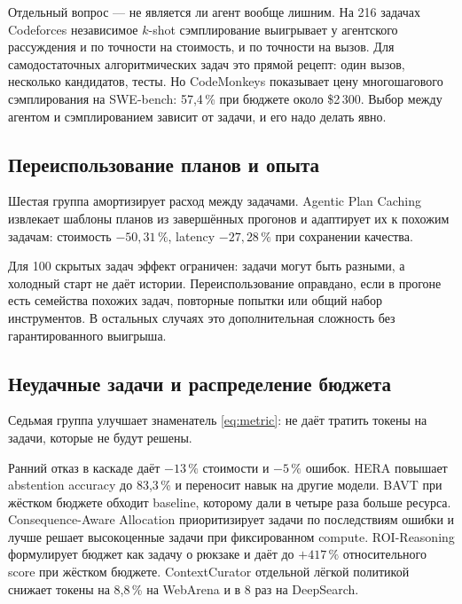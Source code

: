 \documentclass[11pt,a4paper]{article}
\begin{document}
Отдельный вопрос — не является ли агент вообще лишним. На 216 задачах
Codeforces \cite{dong2026independentsamplin} независимое $k$-shot
сэмплирование выигрывает у агентского рассуждения и по точности на
стоимость, и по точности на вызов. Для самодостаточных алгоритмических
задач это прямой рецепт: один вызов, несколько кандидатов, тесты. Но
CodeMonkeys \cite{ehrlich2025codemonkeysscaling} показывает цену
многошагового сэмплирования на SWE-bench: 57{,}4\,\% при бюджете около
\$2\,300. Выбор между агентом и сэмплированием зависит от задачи, и его
надо делать явно.

\subsection{Переиспользование планов и опыта}

Шестая группа амортизирует расход между задачами. Agentic Plan Caching
\cite{zhang2025agenticplan} извлекает шаблоны планов из завершённых
прогонов и адаптирует их к похожим задачам: стоимость $-50{,}31\,\%$,
latency $-27{,}28\,\%$ при сохранении качества.

Для 100 скрытых задач эффект ограничен: задачи могут быть разными, а
холодный старт не даёт истории. Переиспользование оправдано, если в
прогоне есть семейства похожих задач, повторные попытки или общий набор
инструментов. В остальных случаях это дополнительная сложность без
гарантированного выигрыша.

\subsection{Неудачные задачи и распределение бюджета}

Седьмая группа улучшает знаменатель \eqref{eq:metric}: не даёт тратить
токены на задачи, которые не будут решены.

Ранний отказ в каскаде \cite{zellinger2025costsaving} даёт $-13\,\%$
стоимости и $-5\,\%$ ошибок. HERA \cite{luo2026heraharness} повышает
abstention accuracy до 83{,}3\,\% и переносит навык на другие модели.
BAVT \cite{li2026spendreason} при жёстком бюджете обходит baseline,
которому дали в четыре раза больше ресурса. Consequence-Aware Allocation
\cite{he2026allerrors} приоритизирует задачи по последствиям ошибки и
лучше решает высокоценные задачи при фиксированном compute. ROI-Reasoning
\cite{zhao2026roireasoning} формулирует бюджет как задачу о рюкзаке и
даёт до $+417\,\%$ относительного score при жёстком бюджете. ContextCurator
\cite{li2026escapingcontext} отдельной лёгкой политикой снижает токены на
8{,}8\,\% на WebArena и в 8 раз на DeepSearch.
\end{document}
